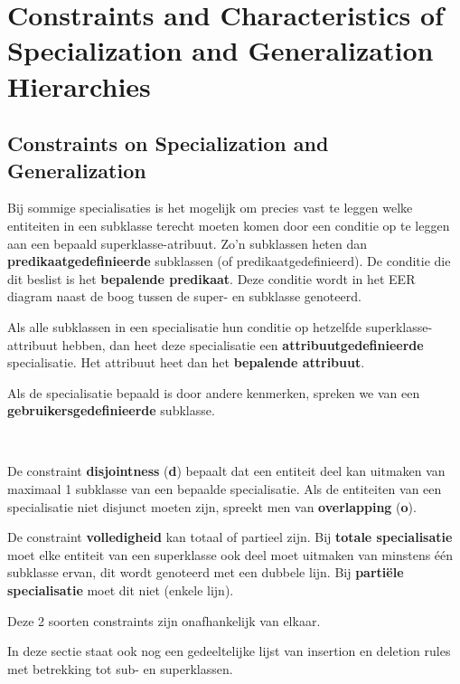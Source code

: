 \section{Constraints and Characteristics of Specialization and Generalization Hierarchies}
\subsection{Constraints on Specialization and Generalization}
Bij sommige specialisaties is het mogelijk om precies vast te leggen welke entiteiten in een subklasse terecht moeten komen door een conditie op te leggen aan een bepaald superklasse-atribuut. Zo'n subklassen heten dan \textbf{predikaatgedefinieerde} subklassen (of predikaatgedefinieerd). De conditie die dit beslist is het \textbf{bepalende predikaat}. Deze conditie wordt in het EER diagram naast de boog tussen de super- en subklasse genoteerd.

Als alle subklassen in een specialisatie hun conditie op hetzelfde superklasse-attribuut hebben, dan heet deze specialisatie een \textbf{attribuutgedefinieerde} specialisatie. Het attribuut heet dan het \textbf{bepalende attribuut}.

Als de specialisatie bepaald is door andere kenmerken, spreken we van een \textbf{gebruikersgedefinieerde} subklasse.

~

\noindent De constraint \textbf{disjointness} (\textbf{d}) bepaalt dat een entiteit deel kan uitmaken van maximaal 1 subklasse van een bepaalde specialisatie. Als de entiteiten van een specialisatie niet disjunct moeten zijn, spreekt men van \textbf{overlapping} (\textbf{o}).

De constraint \textbf{volledigheid} kan totaal of partieel zijn. Bij \textbf{totale specialisatie} moet elke entiteit van een superklasse ook deel moet uitmaken van minstens \'e\'en subklasse ervan, dit wordt genoteerd met een dubbele lijn. Bij \textbf{parti\"ele specialisatie} moet dit niet (enkele lijn).

Deze 2 soorten constraints zijn onafhankelijk van elkaar.


In deze sectie staat ook nog een gedeeltelijke lijst van insertion en deletion rules met betrekking tot sub- en superklassen.
